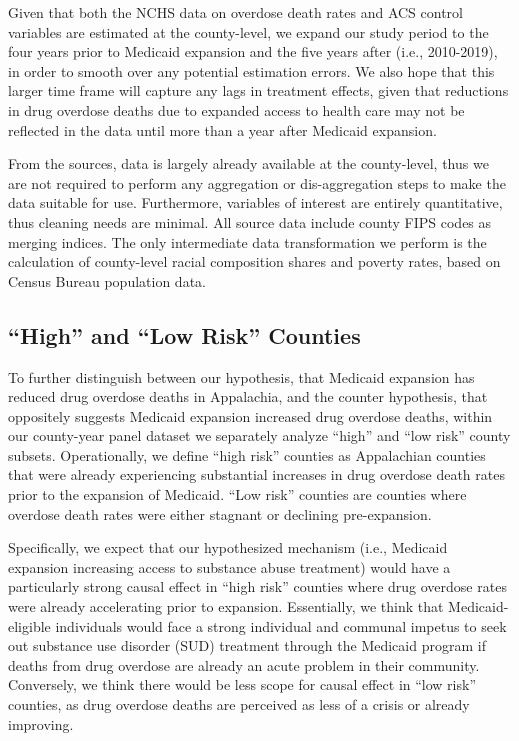 \documentclass[
  11pt,
]{article}
\begin{document}
Given that both the NCHS data on overdose death rates and ACS control
variables are estimated at the county-level, we expand our study period
to the four years prior to Medicaid expansion and the five years after
(i.e., 2010-2019), in order to smooth over any potential estimation
errors. We also hope that this larger time frame will capture any lags
in treatment effects, given that reductions in drug overdose deaths due
to expanded access to health care may not be reflected in the data until
more than a year after Medicaid expansion.

From the sources, data is largely already available at the county-level,
thus we are not required to perform any aggregation or dis-aggregation
steps to make the data suitable for use. Furthermore, variables of
interest are entirely quantitative, thus cleaning needs are minimal. All
source data include county FIPS codes as merging indices. The only
intermediate data transformation we perform is the calculation of
county-level racial composition shares and poverty rates, based on
Census Bureau population data.

\hypertarget{high-and-low-risk-counties}{%
\subsection{``High'' and ``Low Risk''
Counties}\label{high-and-low-risk-counties}}

To further distinguish between our hypothesis, that Medicaid expansion
has reduced drug overdose deaths in Appalachia, and the counter
hypothesis, that oppositely suggests Medicaid expansion increased drug
overdose deaths, within our county-year panel dataset we separately
analyze ``high'' and ``low risk'' county subsets. Operationally, we
define ``high risk'' counties as Appalachian counties that were already
experiencing substantial increases in drug overdose death rates prior to
the expansion of Medicaid. ``Low risk'' counties are counties where
overdose death rates were either stagnant or declining pre-expansion.

Specifically, we expect that our hypothesized mechanism (i.e., Medicaid
expansion increasing access to substance abuse treatment) would have a
particularly strong causal effect in ``high risk'' counties where drug
overdose rates were already accelerating prior to expansion.
Essentially, we think that Medicaid-eligible individuals would face a
strong individual and communal impetus to seek out substance use
disorder (SUD) treatment through the Medicaid program if deaths from
drug overdose are already an acute problem in their community.
Conversely, we think there would be less scope for causal effect in
``low risk'' counties, as drug overdose deaths are perceived as less of
a crisis or already improving.
\end{document}
